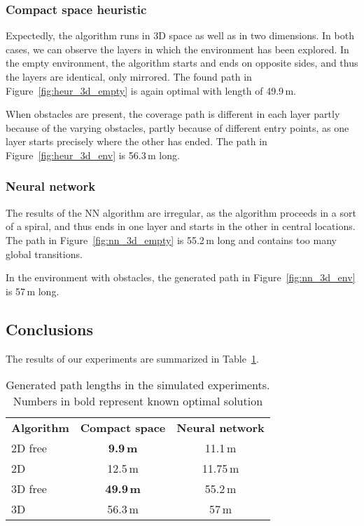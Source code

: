 \documentclass[buriama8_dp.tex]{subfiles}
\begin{document}
\subsubsection{Compact space heuristic}
Expectedly, the algorithm runs in 3D space as well as in two dimensions. In both cases, we can observe the layers in which the environment has been explored. In the empty environment, the algorithm starts and ends on opposite sides, and thus the layers are identical, only mirrored. The found path in Figure~\ref{fig:heur_3d_empty} is again optimal with length of 49.9\,m.

When obstacles are present, the coverage path is different in each layer partly because of the varying obstacles, partly because of different entry points, as one layer starts precisely where the other has ended. The path in Figure~\ref{fig:heur_3d_env} is 56.3\,m long.

\subsubsection{Neural network}
The results of the NN algorithm are irregular, as the algorithm proceeds in a sort of a spiral, and thus ends in one layer and starts in the other in central locations. The path in Figure~\ref{fig:nn_3d_empty} is 55.2\,m long and contains too many global transitions.

In the environment with obstacles, the generated path in Figure~\ref{fig:nn_3d_env} is 57\,m long.


\subsection{Conclusions}
\label{subsec:alg_concl}

The results of our experiments are summarized in Table~\ref{tab:len}.

\begin{table}
\begin{ctucolortab}
\begin{tabular}{l|cc}
\bfseries Algorithm & \bfseries Compact space & \bfseries Neural network \\\Midrule
2D free & \textbf{9.9\,m} & 11.1\,m\\
2D & 12.5\,m & 11.75\,m\\
3D free & \textbf{49.9\,m} & 55.2\,m\\
3D & 56.3\,m & 57\,m
\end{tabular}
\end{ctucolortab}
\caption{Generated path lengths in the simulated experiments. Numbers in bold represent known optimal solution}
\label{tab:len}
\end{table}
\end{document}
